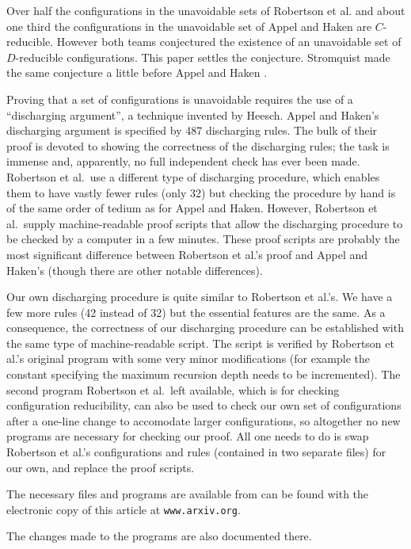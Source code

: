 \documentclass[11pt]{article}
\newcommand{\arxurl}{{\tt www.arxiv.org}}
\newif\ifarxiv
\begin{document}
Over half the configurations in the unavoidable sets of Robertson et al$.$ and about one third the configurations in the unavoidable set of Appel and Haken are $C$-reducible. However both teams conjectured the existence of an unavoidable set of $D$-reducible configurations. This paper settles the conjecture. Stromquist \cite{stromquist} made the same conjecture a little before Appel and Haken \cite{ah1}.

Proving that a set of configurations is unavoidable requires the use of a ``discharging argument'', a technique invented by Heesch. Appel and Haken's discharging argument is specified by 487 discharging rules. The bulk of their proof is devoted to showing the correctness of the discharging rules; the task is immense and, apparently, no full independent check has ever been made. Robertson et al.~use a different type of discharging procedure, which enables them to have vastly fewer rules (only 32) but checking the procedure by hand is of the same order of tedium as for Appel and Haken. However, Robertson et al.~supply machine-readable proof scripts that allow the discharging procedure to be checked by a computer in a few minutes. These proof scripts are probably the most significant difference between Robertson et al.'s proof and Appel and Haken's (though there are other notable differences).

Our own discharging procedure is quite similar to Robertson et al.'s. We have a few more rules (42 instead of 32) but the essential features are the same. As a consequence, the correctness of our discharging procedure can be established with the same type of machine-readable script. The script is verified by Robertson et al.'s original program with some very minor modifications (for example the constant specifying the maximum recursion depth needs to be incremented). The second program Robertson et al.~left available, which is for checking configuration reducibility, can also be used to check our own set of configurations after a one-line change to accomodate larger configurations, so altogether no new programs are necessary for checking our proof. All one needs to do is swap Robertson et al.'s configurations and rules (contained in two separate files) for our own, and replace the proof scripts. 
\ifarxiv
The necessary files and programs are in the `aux' folder accomponaying this arxiv submission. 
\else
The necessary files and programs are available from can be found with the electronic copy of this article at \arxurl. 
\fi
The changes made to the programs are also documented there.
\end{document}
